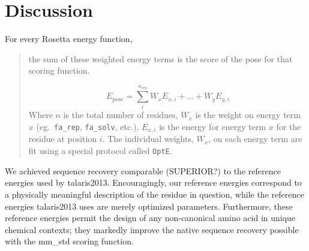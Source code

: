 \section{Discussion}
For every Rosetta energy function,
\begin{quote}
the sum of these weighted energy terms is the score of the pose for that scoring function. 

\begin{equation}
E_{\text{pose}} = \sum_{i}^{n_{\text{res}}} W_{x} E_{x,i} + ... + W_{y} E_{y,i}
\end{equation}
Where $n$ is the total number of residues, $W_{x}$ is the weight on energy term $x$ (eg.\ \texttt{fa\_rep}, \texttt{fa\_solv}, etc.), $E_{x,i}$ is the energy for energy term $x$ for the residue at position $i$. 
The individual weights, $W_x$, on each energy term are fit using a special protocol called \texttt{OptE}.
\end{quote}
We achieved sequence recovery comparable (SUPERIOR?) to the reference energies used by talaris2013.
Encouragingly, our reference energies correspond to a physically meaningful description of the residue in question, while the reference energies talaris2013 uses are merely optimized parameters.
Furthermore, these reference energies permit the design of any non-canonical amino acid in unique chemical contexts; they markedly improve the native sequence recovery possible with the mm\_std scoring function.


